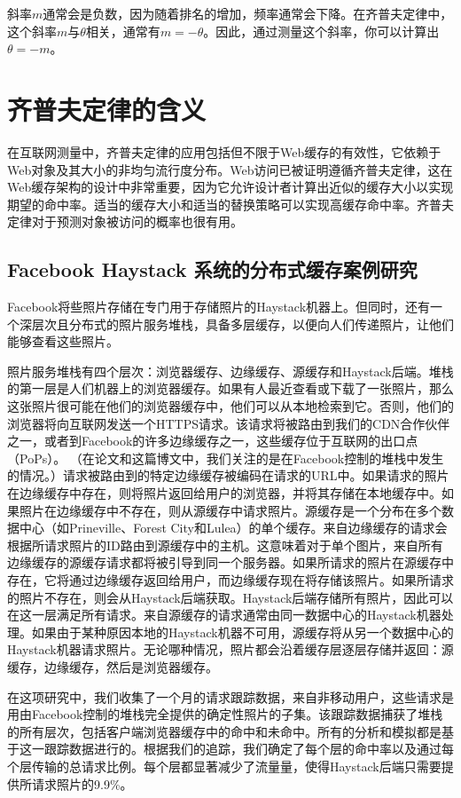 斜率$m$通常会是负数，因为随着排名的增加，频率通常会下降。在齐普夫定律中，这个斜率$m$与$\theta$相关，通常有$m=−\theta$。因此，通过测量这个斜率，你可以计算出$\theta=−m$。
\section{齐普夫定律的含义}

在互联网测量中，齐普夫定律的应用包括但不限于Web缓存的有效性，它依赖于Web对象及其大小的非均匀流行度分布。Web访问已被证明遵循齐普夫定律，这在Web缓存架构的设计中非常重要，因为它允许设计者计算出近似的缓存大小以实现期望的命中率。适当的缓存大小和适当的替换策略可以实现高缓存命中率。齐普夫定律对于预测对象被访问的概率也很有用。

\subsection{Facebook Haystack 系统的分布式缓存案例研究}

Facebook将些照片存储在专门用于存储照片的Haystack机器上。但同时，还有一个深层次且分布式的照片服务堆栈，具备多层缓存，以便向人们传递照片，让他们能够查看这些照片。

照片服务堆栈有四个层次：浏览器缓存、边缘缓存、源缓存和Haystack后端。堆栈的第一层是人们机器上的浏览器缓存。如果有人最近查看或下载了一张照片，那么这张照片很可能在他们的浏览器缓存中，他们可以从本地检索到它。否则，他们的浏览器将向互联网发送一个HTTPS请求。该请求将被路由到我们的CDN合作伙伴之一，或者到Facebook的许多边缘缓存之一，这些缓存位于互联网的出口点（PoPs）。 （在论文和这篇博文中，我们关注的是在Facebook控制的堆栈中发生的情况。）请求被路由到的特定边缘缓存被编码在请求的URL中。如果请求的照片在边缘缓存中存在，则将照片返回给用户的浏览器，并将其存储在本地缓存中。如果照片在边缘缓存中不存在，则从源缓存中请求照片。源缓存是一个分布在多个数据中心（如Prineville、Forest City和Lulea）的单个缓存。来自边缘缓存的请求会根据所请求照片的ID路由到源缓存中的主机。这意味着对于单个图片，来自所有边缘缓存的源缓存请求都将被引导到同一个服务器。如果所请求的照片在源缓存中存在，它将通过边缘缓存返回给用户，而边缘缓存现在将存储该照片。如果所请求的照片不存在，则会从Haystack后端获取。Haystack后端存储所有照片，因此可以在这一层满足所有请求。来自源缓存的请求通常由同一数据中心的Haystack机器处理。如果由于某种原因本地的Haystack机器不可用，源缓存将从另一个数据中心的Haystack机器请求照片。无论哪种情况，照片都会沿着缓存层逐层存储并返回：源缓存，边缘缓存，然后是浏览器缓存。

在这项研究中，我们收集了一个月的请求跟踪数据，来自非移动用户，这些请求是用由Facebook控制的堆栈完全提供的确定性照片的子集。该跟踪数据捕获了堆栈的所有层次，包括客户端浏览器缓存中的命中和未命中。所有的分析和模拟都是基于这一跟踪数据进行的。根据我们的追踪，我们确定了每个层的命中率以及通过每个层传输的总请求比例。每个层都显著减少了流量量，使得Haystack后端只需要提供所请求照片的9.9\%。


